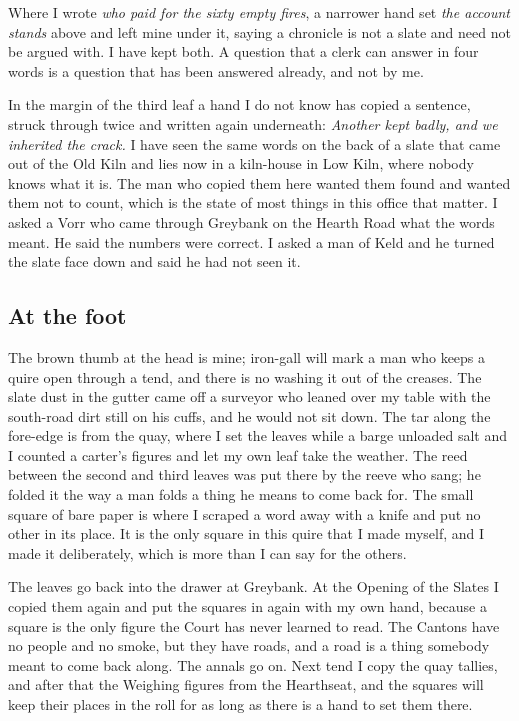 \documentclass{design/chronicle}
\begin{document}
Where I wrote \emph{who paid for the sixty empty fires}, a narrower hand set \emph{the account stands} above and left mine under it, saying a chronicle is not a slate and need not be argued with. I have kept both. A question that a clerk can answer in four words is a question that has been answered already, and not by me.

In the margin of the third leaf a hand I do not know has copied a sentence, struck through twice and written again underneath: \emph{Another kept badly, and we inherited the crack.} I have seen the same words on the back of a slate that came out of the Old Kiln and lies now in a kiln-house in Low Kiln, where nobody knows what it is. The man who copied them here wanted them found and wanted them not to count, which is the state of most things in this office that matter. I asked a Vorr who came through Greybank on the Hearth Road what the words meant. He said the numbers were correct. I asked a man of Keld and he turned the slate face down and said he had not seen it.

\subsection*{At the foot}

The brown thumb at the head is mine; iron-gall will mark a man who keeps a quire open through a tend, and there is no washing it out of the creases. The slate dust in the gutter came off a surveyor who leaned over my table with the south-road dirt still on his cuffs, and he would not sit down. The tar along the fore-edge is from the quay, where I set the leaves while a barge unloaded salt and I counted a carter’s figures and let my own leaf take the weather. The reed between the second and third leaves was put there by the reeve who sang; he folded it the way a man folds a thing he means to come back for. The small square of bare paper is where I scraped a word away with a knife and put no other in its place. It is the only square in this quire that I made myself, and I made it deliberately, which is more than I can say for the others.

The leaves go back into the drawer at Greybank. At the Opening of the Slates I copied them again and put the squares in again with my own hand, because a square is the only figure the Court has never learned to read. The Cantons have no people and no smoke, but they have roads, and a road is a thing somebody meant to come back along. The annals go on. Next tend I copy the quay tallies, and after that the Weighing figures from the Hearthseat, and the squares will keep their places in the roll for as long as there is a hand to set them there.
\end{document}

